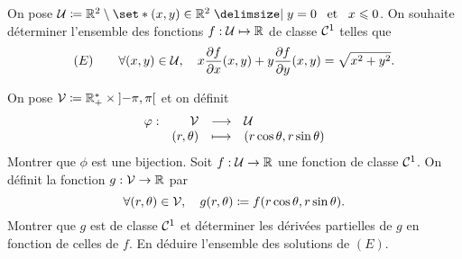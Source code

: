 \documentclass{magnolia}
\begin{document}
On pose $\mathcal{U}\defeq\R^2\setminus\enstq{(x,y)\in\R^2}{y=0 \et x\leq 0}$. On souhaite
déterminer l'ensemble des fonctions $f:\mathcal{U}\mapsto\mathbb{R}$ de classe $\mathcal{C}^{1}$ telles que
\[(E) \qquad \forall (x,y)\in\mathcal{U} ,\quad
  x\frac{\partial f}{\partial x}(x,y)+y\frac{\partial f}{\partial y}(x,y)=
  \sqrt{x^2+y^2}.\]
\begin{questions}
\question On pose $\mathcal{V}\coloneqq \mathbb{R}_+^*\times\left]-\pi,\pi\right[$ et on définit
  \[\begin{array}[t]{lrcl} \displaystyle{\varphi} : & \displaystyle{\mathcal{V}} & \longrightarrow & \displaystyle{\mathcal{U}} \\ & \displaystyle{(r,\theta)} & \longmapsto & \displaystyle{(r\cos \theta,r \sin \theta)} \end{array}\]
  Montrer que $\phi$ est une bijection.
\question Soit $f:\mathcal{U}\to\mathbb{R}$ une fonction de classe $\mathcal{C}^{1}$. On
  définit la fonction $g:\mathcal{V}\to\mathbb{R}$ par
  \[\forall (r,\theta)\in\mathcal{V},\quad g(r,\theta)\coloneqq f(r\cos \theta,r\sin\theta).\]
  Montrer que $g$ est de classe $\mathcal{C}^{1}$ et déterminer les dérivées partielles de $g$ en fonction de celles de $f$.
\question En déduire l'ensemble des solutions de $(E)$.
\end{questions}

\end{document}
